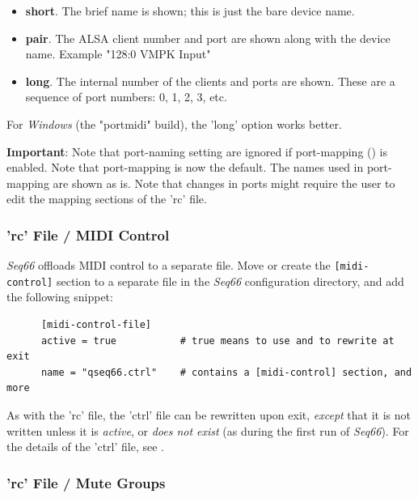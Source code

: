    \begin{itemize}
      \item \textbf{short}.
         The brief name is shown; this is just the bare device name.
      \item \textbf{pair}.
         The ALSA client number and port are shown along with the device name.
         Example "128:0 VMPK Input"
      \item \textbf{long}.
         The internal number of the clients and ports are shown.
         These are a sequence of port numbers: 0, 1, 2, 3, etc.
   \end{itemize}

   For \textsl{Windows} (the "portmidi" build),
   the 'long' option works better.

   \textbf{Important}: Note that port-naming setting are ignored if
   port-mapping () is enabled. Note that
   port-mapping is now the default.
   The names used in port-mapping are shown as is.
   Note that changes in ports might require the user to edit
   the mapping sections of the 'rc' file.

\subsubsection{'rc' File / MIDI Control}
\label{subsubsec:configuration_rc_midi_control}

   \textsl{Seq66} offloads MIDI control to a separate file.
   Move or create
   the \texttt{[midi-control]} section to a separate file in
   the \textsl{Seq66} configuration directory, and add the following
   snippet:

   \begin{verbatim}
      [midi-control-file]
      active = true           # true means to use and to rewrite at exit
      name = "qseq66.ctrl"    # contains a [midi-control] section, and more
   \end{verbatim}

   As with the 'rc' file, the 'ctrl' file can be rewritten upon exit,
   \textsl{except} that it is not written unless it is \textsl{active},
   or \textsl{does not exist} (as during the first run of \textsl{Seq66}).
   For the details of the 'ctrl' file, see
   .

\subsubsection{'rc' File / Mute Groups}
\label{subsubsec:configuration_rc_mute_groups}

